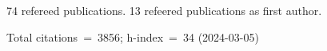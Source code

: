 74 refereed publications. 13 refeered publications as first author.

Total citations~=~3856; h-index~=~34 (2024-03-05)